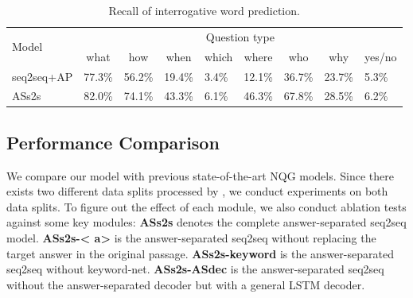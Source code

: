 \documentclass[letterpaper]{article} %
\newcommand\Tstrut{\rule{0pt}{2.3ex}}         %
\begin{document}
\begin{table}[!htb]
\centering
\begin{tabular}{|l|l|l|l|l|l|l|l|l|}
\hline
\multirow{2}{*}{Model} & \multicolumn{8}{c|}{Question type}\Tstrut  \\ \cline{2-9} 
 & \multicolumn{1}{c|}{what} & \multicolumn{1}{c|}{how} & \multicolumn{1}{c|}{when} & \multicolumn{1}{c|}{which} & \multicolumn{1}{c|}{where} & \multicolumn{1}{c|}{who} & \multicolumn{1}{c|}{why} & \multicolumn{1}{c|}{yes/no}\Tstrut  \\ \hline
seq2seq+AP & 77.3\% & 56.2\% & 19.4\% & 3.4\% & 12.1\% & 36.7\% & 23.7\% & 5.3\%\Tstrut  \\ \hline
ASs2s & 82.0\% & 74.1\% & 43.3\% & 6.1\% & 46.3\% & 67.8\% & 28.5\% & 6.2\%\Tstrut  \\ \hline
\end{tabular}
\caption{Recall of interrogative word prediction.}
\label{table:interrogative word}
\end{table}


\subsection{Performance Comparison}
We compare our model with previous state-of-the-art NQG models. Since there exists two different data splits processed by \cite{du2017learning,zhou2017neural}, we conduct experiments on both data splits. To figure out the effect of each module, we also conduct ablation tests against some key modules: \textbf{ASs2s} denotes the complete answer-separated seq2seq model. \textbf{ASs2s-\textless{} a\textgreater{}} is the answer-separated seq2seq without replacing the target answer in the original passage. \textbf{ASs2s-keyword} is the answer-separated seq2seq without keyword-net. \textbf{ASs2s-ASdec} is the answer-separated seq2seq without the answer-separated decoder but with a general LSTM decoder.
\end{document}
